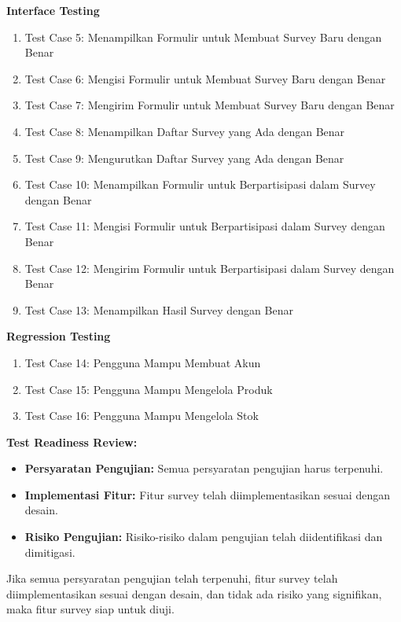 \documentclass[12pt]{article}
\begin{document}
\textbf{Interface Testing}

\begin{enumerate}
    \item Test Case 5: Menampilkan Formulir untuk Membuat Survey Baru dengan Benar
    \item Test Case 6: Mengisi Formulir untuk Membuat Survey Baru dengan Benar
    \item Test Case 7: Mengirim Formulir untuk Membuat Survey Baru dengan Benar
    \item Test Case 8: Menampilkan Daftar Survey yang Ada dengan Benar
    \item Test Case 9: Mengurutkan Daftar Survey yang Ada dengan Benar
    \item Test Case 10: Menampilkan Formulir untuk Berpartisipasi dalam Survey dengan Benar
    \item Test Case 11: Mengisi Formulir untuk Berpartisipasi dalam Survey dengan Benar
    \item Test Case 12: Mengirim Formulir untuk Berpartisipasi dalam Survey dengan Benar
    \item Test Case 13: Menampilkan Hasil Survey dengan Benar
\end{enumerate}

\textbf{Regression Testing}

\begin{enumerate}
    \item Test Case 14: Pengguna Mampu Membuat Akun
    \item Test Case 15: Pengguna Mampu Mengelola Produk
    \item Test Case 16: Pengguna Mampu Mengelola Stok
\end{enumerate}

\textbf{Test Readiness Review:}

\begin{itemize}
    \item \textbf{Persyaratan Pengujian:} Semua persyaratan pengujian harus terpenuhi.
    \item \textbf{Implementasi Fitur:} Fitur survey telah diimplementasikan sesuai dengan desain.
    \item \textbf{Risiko Pengujian:} Risiko-risiko dalam pengujian telah diidentifikasi dan dimitigasi.
\end{itemize}



Jika semua persyaratan pengujian telah terpenuhi, fitur survey telah diimplementasikan sesuai dengan desain, dan tidak ada risiko yang signifikan, maka fitur survey siap untuk diuji.
\end{document}

